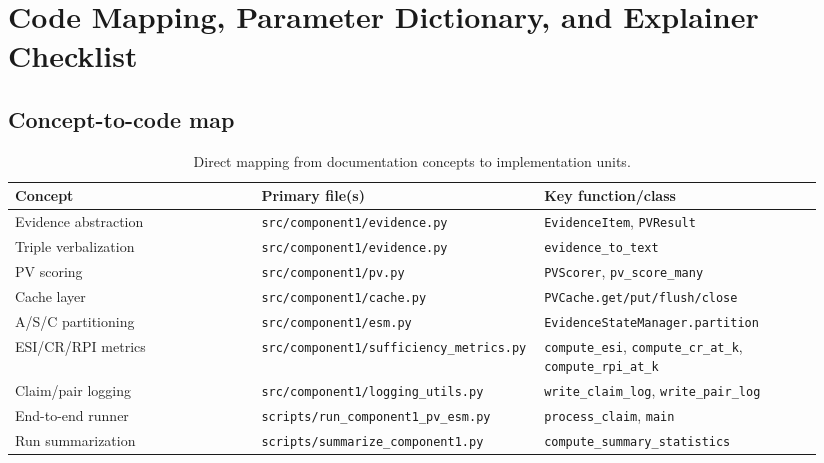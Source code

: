 \section{Code Mapping, Parameter Dictionary, and Explainer Checklist}
\label{sec:c1_mapping}

\subsection{Concept-to-code map}
\begin{table}[H]
\centering
\begin{tabular}{@{}p{0.30\linewidth}p{0.30\linewidth}p{0.34\linewidth}@{}}
\toprule
Concept & Primary file(s) & Key function/class \\
\midrule
Evidence abstraction & \texttt{src/component1/evidence.py} & \texttt{EvidenceItem}, \texttt{PVResult} \\
Triple verbalization & \texttt{src/component1/evidence.py} & \texttt{evidence\_to\_text} \\
PV scoring & \texttt{src/component1/pv.py} & \texttt{PVScorer}, \texttt{pv\_score\_many} \\
Cache layer & \texttt{src/component1/cache.py} & \texttt{PVCache.get/put/flush/close} \\
A/S/C partitioning & \texttt{src/component1/esm.py} & \texttt{EvidenceStateManager.partition} \\
ESI/CR/RPI metrics & \texttt{src/component1/sufficiency\_metrics.py} & \texttt{compute\_esi}, \texttt{compute\_cr\_at\_k}, \texttt{compute\_rpi\_at\_k} \\
Claim/pair logging & \texttt{src/component1/logging\_utils.py} & \texttt{write\_claim\_log}, \texttt{write\_pair\_log} \\
End-to-end runner & \texttt{scripts/run\_component1\_pv\_esm.py} & \texttt{process\_claim}, \texttt{main} \\
Run summarization & \texttt{scripts/summarize\_component1.py} & \texttt{compute\_summary\_statistics} \\
\bottomrule
\end{tabular}
\caption{Direct mapping from documentation concepts to implementation units.}
\label{tab:c1_concept_map}
\end{table}

